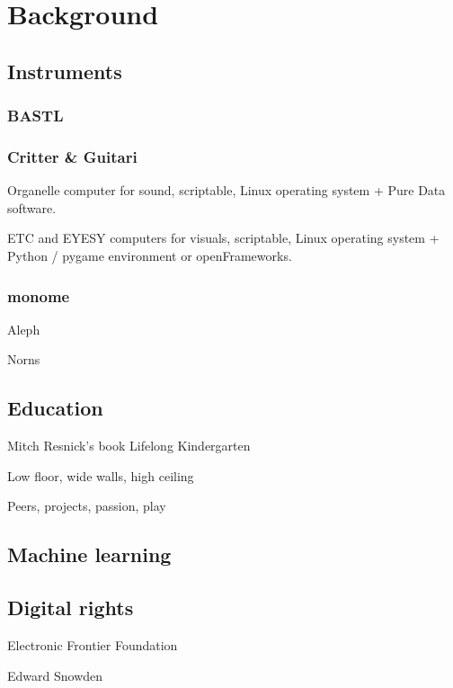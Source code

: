 \chapter{Background}

\section{Instruments}

\subsection{BASTL}

\subsection{Critter \& Guitari}

Organelle computer for sound, scriptable, Linux operating system + Pure Data software.

ETC and EYESY computers for visuals, scriptable, Linux operating system + Python / pygame environment or openFrameworks.

\subsection{monome}

Aleph

Norns

\section{Education}

Mitch Resnick's book Lifelong Kindergarten

Low floor, wide walls, high ceiling

Peers, projects, passion, play

\section{Machine learning}

\section{Digital rights}

Electronic Frontier Foundation

Edward Snowden
